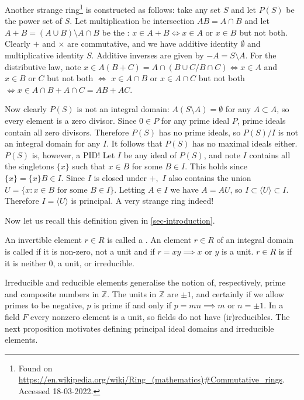 \begin{example}
Another strange ring\footnote{Found on \url{https://en.wikipedia.org/wiki/Ring_(mathematics)\#Commutative_rings}. Accessed 18-03-2022.} is constructed as follows: take any set $S$ and let $P(S)$ be the power set of $S$. Let multiplication be intersection $AB=A\cap B$ and let $A+B=(A\cup B)\setminus A\cap B$ be the : $x\in A+B\iff x\in A$ or $x\in B$ but not both. Clearly $+$ and $\times$ are commutative, and we have additive identity $\emptyset$ and multiplicative identity $S$. Additive inverses are given by $-A=S\setminus A$. For the distributive law, note $x\in A(B+C)=A\cap (B\cup C/B\cap C)\iff x\in A$ and $x\in B$ or $C$ but not both $\iff$ $x\in A\cap B$ or $x\in A\cap C$ but not both $\iff x\in A\cap B + A \cap C=AB+AC$.

Now clearly $P(S)$ is not an integral domain: $A(S\setminus A)=\emptyset$ for any $A\subset A$, so every element is a zero divisor. Since $0\in P$ for any prime ideal $P$, prime ideals contain all zero divisors. Therefore $P(S)$ has no prime ideals, so $P(S)/I$ is not an integral domain for any $I$. It follows that $P(S)$ has no maximal ideals either. $P(S)$ is, however, a PID! Let $I$ be any ideal of $P(S)$, and note $I$ contains all the singletons $\{x\}$ such that $x\in B$ for some $B\in I$. This holds since $\{x\}=\{x\}B\in I$. Since $I$ is closed under $+,$ $I$ also contains the union $U=\{x:x\in B\text{ for some } B\in I\}$. Letting $A\in I$ we have $A=AU$, so $I\subset \langle U\rangle \subset I$. Therefore $I=\langle U\rangle$ is principal. A very strange ring indeed!
\end{example}

Now let us recall this definition given in \cref{sec-introduction}.
\begin{definition}
An invertible element $r\in R$ is called a . An element $r\in R$ of an integral domain is called  if it is non-zero, not a unit and if $r=xy\implies x$ or $y$ is a unit. $r\in R$ is  if it is neither $0$, a unit, or irreducible.
\end{definition}
Irreducible and reducible elements generalise the notion of, respectively, prime and composite numbers in $\mathbb{Z}$. The units in $\mathbb{Z}$ are $\pm 1$, and certainly if we allow primes to be negative, $p$ is prime if and only if $p=mn\implies m$ or $n=\pm 1$. In a field $F$ every nonzero element is a unit, so fields do not have (ir)reducibles. The next proposition motivates defining principal ideal domains and irreducible elements.

